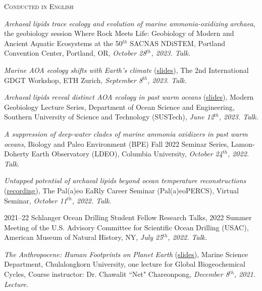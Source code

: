 \documentclass[10pt, letter]{article}
\newcommand{\margintext}[1]{\marginnote{\normalsize\textbf #1 |}}
\begin{document}
\bigskip
\margintext{Invited Talks \& Lectures}
\textsc{Conducted in English}
\begin{etaremune}

\item \textit{Archaeal lipids trace ecology and evolution of marine ammonia-oxidizing archaea}, the geobiology session Where Rock Meets Life: Geobiology of Modern and Ancient Aquatic Ecosystems at the 50$^{th}$ SACNAS NDiSTEM, Portland Convention Center, Portland, OR, \textit{October 28$^{th}$, 2023. Talk.}

\item \textit{Marine AOA ecology shifts with Earth’s climate} (\href{https://tamucs-my.sharepoint.com/:b:/g/personal/rrattan_tamu_edu/EZQsnDcppXpAkxq9H8E_L1YBK_Jnd2zL1lPQwsRLIZZ_xw?e=ilpAa1}{slides}), The 2nd International GDGT Workshop, ETH Zurich, \textit{September 8$^{th}$, 2023. Talk.}

\item \textit{Archaeal lipids reveal distinct AOA ecology in past warm oceans} (\href{https://tamucs-my.sharepoint.com/:b:/g/personal/rrattan_tamu_edu/ET9FxsRS79dBv4giDLNmCKIB0X_tnPspwI18D1e8uKEFLw?e=6On32v}{slides}), Modern Geobiology Lecture Series, Department of Ocean Science and Engineering, Southern University of Science and Technology (SUSTech), \textit{June 12$^{th}$, 2023. Talk.}

\item \textit{A suppression of deep-water clades of marine ammonia oxidizers in past warm oceans}, Biology and Paleo Environment (BPE) Fall 2022 Seminar Series, Lamon-Doherty Earth Observatory (LDEO), Columbia University, \textit{October 24$^{th}$, 2022. Talk.}

\item \textit{Untapped potential of archaeal lipids beyond ocean temperature reconstructions} (\href{https://www.youtube.com/watch?v=95o7ogv_T9I}{recording}), The Pal(a)eo EaRly Career Seminar (Pal(a)eoPERCS), Virtual Seminar, \textit{October 11$^{th}$, 2022. Talk.}

\item 2021–22 Schlanger Ocean Drilling Student Fellow Research Talks, 2022 Summer Meeting of the U.S. Advisory Committee for Scientific Ocean Drilling (USAC), American Museum of Natural History, NY, \textit{July 25$^{th}$, 2022. Talk.}

\item \textit{The Anthropocene: Human Footprints on Planet Earth} (\href{https://docs.google.com/presentation/d/1XTTknlXZghoFSpxdI-8KNPqmwrOvbwUQ9sDqNNvJDf0/edit?usp=sharing}{slides}), Marine Science Department, Chulalongkorn University, one lecture for Global Biogeochemical Cycles, Course instructor: Dr. Chawalit ``Net" Chareonpong, \textit{December 8$^{th}$, 2021. Lecture.}
\end{etaremune}
\end{document}
